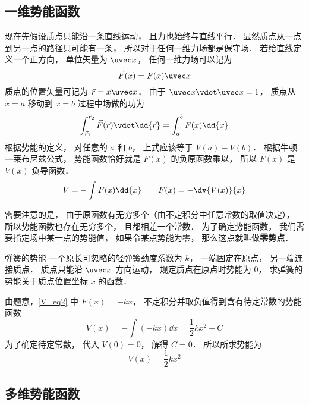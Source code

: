 \subsection{一维势能函数}

现在先假设质点只能沿一条直线运动， 且力也始终与直线平行． 显然质点从一点到另一点的路径只可能有一条， 所以对于任何一维力场都是保守场． 若给直线定义一个正方向， 单位矢量为 $\uvec x$， 任何一维力场可以记为
\begin{equation}\label{V_eq2}
\vec F(x) = F(x) \uvec x
\end{equation}
质点的位置矢量可记为 $\vec r = x \uvec x$． 由于 $\uvec x \vdot \uvec x = 1$， 质点从 $x = a$ 移动到 $x=b$ 过程中场做的功为
\begin{equation}
\int_{\vec r_1}^{\vec r_2} \vec F(\vec r) \vdot \dd{\vec r}
= \int_a^b F(x) \dd{x}
\end{equation}
根据势能的定义， 对任意的 $a$ 和 $b$， 上式应该等于 $V(a) - V(b)$． 根据牛顿—莱布尼兹公式， 势能函数恰好就是 $F(x)$ 的负原函数乘以， 所以 $F(x)$ 是 $V(x)$ 负导函数．
\begin{equation}\label{V_eq8}
V = -\int F(x) \dd{x}
\qquad
F(x) = -\dv{V(x)}{x}
\end{equation}

需要注意的是， 由于原函数有无穷多个（由不定积分中任意常数的取值决定）， 所以势能函数也存在无穷多个， 且都相差一个常数． 为了确定势能函数， 我们需要指定场中某一点的势能值， 如果令某点势能为零， 那么这点就叫做\textbf{零势点}．

\begin{exam}{弹簧的势能}
一个原长可忽略的轻弹簧劲度系数为 $k$， 一端固定在原点， 另一端连接质点． 质点只能沿 $\uvec x$ 方向运动， 规定质点在原点时势能为 $0$， 求弹簧的势能关于质点位置坐标 $x$ 的函数． 

由题意，\autoref{V_eq2} 中 $F(x) = -kx$， 不定积分并取负值得到含有待定常数的势能函数
\begin{equation}
V(x) = -\int (-kx) \dd{x} = \frac 12 k x^2 - C
\end{equation}
为了确定待定常数， 代入 $V(0) = 0$， 解得 $C = 0$． 所以所求势能为
\begin{equation}
V(x) =  \frac 12 k x^2
\end{equation}
\end{exam}


\subsection{多维势能函数}

